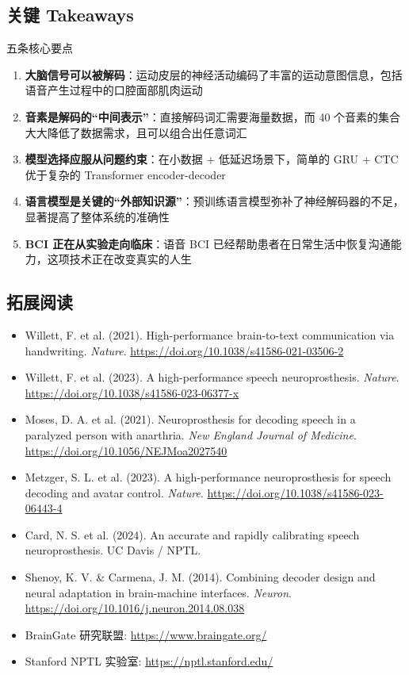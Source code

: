 \documentclass[a4paper]{article}
\begin{document}
\subsection{关键 Takeaways}

\begin{importantbox}{五条核心要点}
\begin{enumerate}
    \item \textbf{大脑信号可以被解码}：运动皮层的神经活动编码了丰富的运动意图信息，包括语音产生过程中的口腔面部肌肉运动
    \item \textbf{音素是解码的``中间表示''}：直接解码词汇需要海量数据，而 40 个音素的集合大大降低了数据需求，且可以组合出任意词汇
    \item \textbf{模型选择应服从问题约束}：在小数据 + 低延迟场景下，简单的 GRU + CTC 优于复杂的 Transformer encoder-decoder
    \item \textbf{语言模型是关键的``外部知识源''}：预训练语言模型弥补了神经解码器的不足，显著提高了整体系统的准确性
    \item \textbf{BCI 正在从实验走向临床}：语音 BCI 已经帮助患者在日常生活中恢复沟通能力，这项技术正在改变真实的人生
\end{enumerate}
\end{importantbox}

\subsection{拓展阅读}

\begin{itemize}
    \item Willett, F. et al. (2021). High-performance brain-to-text communication via handwriting. \textit{Nature}. \url{https://doi.org/10.1038/s41586-021-03506-2}
    \item Willett, F. et al. (2023). A high-performance speech neuroprosthesis. \textit{Nature}. \url{https://doi.org/10.1038/s41586-023-06377-x}
    \item Moses, D. A. et al. (2021). Neuroprosthesis for decoding speech in a paralyzed person with anarthria. \textit{New England Journal of Medicine}. \url{https://doi.org/10.1056/NEJMoa2027540}
    \item Metzger, S. L. et al. (2023). A high-performance neuroprosthesis for speech decoding and avatar control. \textit{Nature}. \url{https://doi.org/10.1038/s41586-023-06443-4}
    \item Card, N. S. et al. (2024). An accurate and rapidly calibrating speech neuroprosthesis. UC Davis / NPTL.
    \item Shenoy, K. V. \& Carmena, J. M. (2014). Combining decoder design and neural adaptation in brain-machine interfaces. \textit{Neuron}. \url{https://doi.org/10.1016/j.neuron.2014.08.038}
    \item BrainGate 研究联盟: \url{https://www.braingate.org/}
    \item Stanford NPTL 实验室: \url{https://nptl.stanford.edu/}
\end{itemize}
\end{document}
